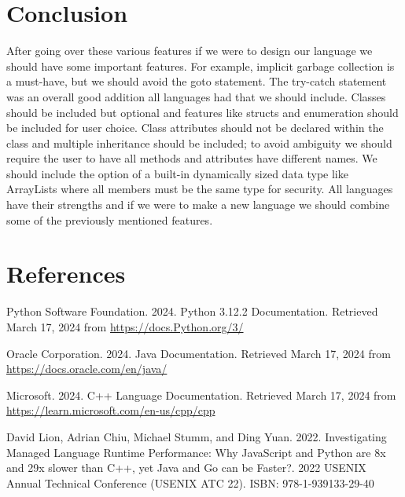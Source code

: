 \documentclass[sigconf, nonacm, authorversion, language=english, 12pt]{acmart}
\def\tab{\hspace*{5mm}}
\begin{document}
\section{Conclusion}
\tab After going over these various features if we were to design our language we should have some important features. For example, implicit garbage collection is a must-have, but we should avoid
the goto statement. The try-catch statement was an overall good addition all languages had that we should include. Classes should be included but optional and features like structs and enumeration should be
included for user choice. Class attributes should not be declared within the class and multiple inheritance should be included; to avoid ambiguity we should require the user to have
all methods and attributes have different names. We should include the option of a built-in dynamically sized data type like ArrayLists where all members must be the same type for security. All languages have their
strengths and if we were to make a new language we should combine some of the previously mentioned features.

\section*{References}
\begin{enumerate}[label={[\arabic*]}]
  \item Python Software Foundation. 2024. Python 3.12.2 Documentation. Retrieved March 17, 2024 from \href{https://docs.Python.org/3/}{https://docs.Python.org/3/}\\

  \item Oracle Corporation. 2024. Java Documentation. Retrieved March 17, 2024 from\\ \href{https://docs.oracle.com/en/java/}{https://docs.oracle.com/en/java/}\\

  \item Microsoft. 2024. C++ Language Documentation. Retrieved March 17, 2024 from\\ \href{https://learn.microsoft.com/en-us/cpp/cpp/?view=msvc-170}{https://learn.microsoft.com/en-us/cpp/cpp}\\

  \item David Lion, Adrian Chiu, Michael Stumm, and Ding Yuan. 2022. Investigating Managed Language Runtime Performance: Why JavaScript and Python are 8x and 29x slower than C++, yet Java and Go can be Faster?.
        2022 USENIX Annual Technical Conference (USENIX ATC 22). ISBN: 978-1-939133-29-40\\
\end{enumerate}
\end{document}
